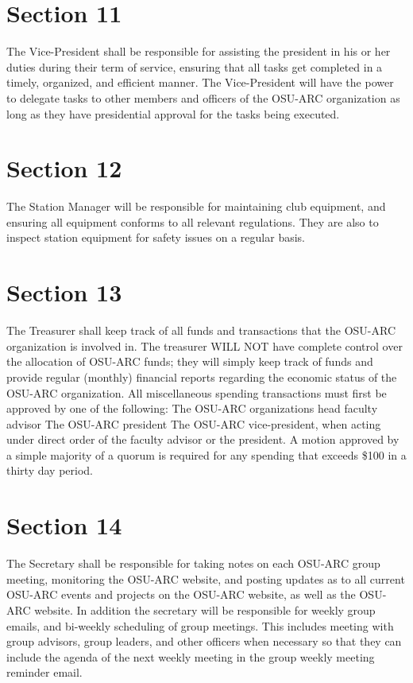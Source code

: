 \documentclass[10pt,letterpaper]{article}
\begin{document}
\section*{Section 11} The Vice-President shall be responsible for assisting the president in his or her duties during their term of service, ensuring that all tasks get completed in a timely, organized, and efficient manner. The Vice-President will have the power to delegate tasks to other members and officers of the OSU-ARC organization as long as they have presidential approval for the tasks being executed.
\section*{Section 12} The Station Manager will be responsible for maintaining club equipment, and ensuring all equipment conforms to all relevant regulations. They are also to inspect station equipment for safety issues on a regular basis. 
\section*{Section 13} The Treasurer shall keep track of all funds and transactions that the OSU-ARC organization is involved in. The treasurer WILL NOT have complete control over the allocation of OSU-ARC funds; they will simply keep track of funds and provide regular (monthly) financial reports regarding the economic status of the OSU-ARC organization. All miscellaneous spending transactions must first be approved by one of the following:
The OSU-ARC organizations head faculty advisor
The OSU-ARC president
The OSU-ARC vice-president, when acting under direct order of the faculty advisor or the president.
A motion approved by a simple majority of a quorum is required for any spending that exceeds \$100 in a thirty day period.
\section*{Section 14} The Secretary shall be responsible for taking notes on each OSU-ARC group meeting, monitoring the OSU-ARC website, and posting updates as to all current OSU-ARC events and projects on the OSU-ARC website, as well as the OSU-ARC website. In addition the secretary will be responsible for weekly group emails, and bi-weekly scheduling of group meetings. This includes meeting with group advisors, group leaders, and other officers when necessary so that they can include the agenda of the next weekly meeting in the group weekly meeting reminder email.
\end{document}

